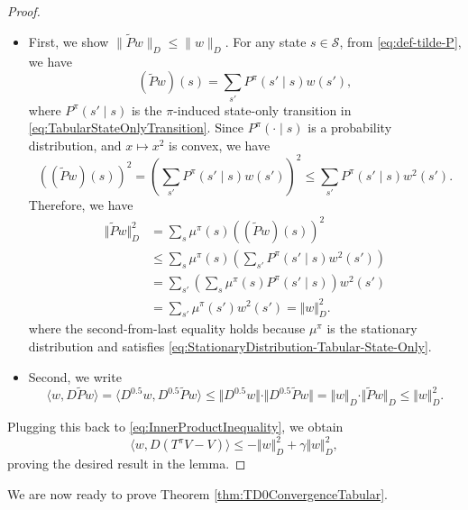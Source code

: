 \documentclass[
]{book}
\theoremstyle{definition}
\theoremstyle{definition}
\theoremstyle{definition}
\theoremstyle{definition}
\theoremstyle{remark}
\begin{document}
\begin{proof}
\begin{itemize}
\item
  First, we show \(\|\widetilde P w\|_D\le \|w\|_D\). For any state \(s \in \mathcal{S}\), from \eqref{eq:def-tilde-P}, we have
  \[
  (\widetilde P w)(s) = \sum_{s'} P^\pi (s' \mid s) w(s'),
  \]
  where \(P^\pi(s' \mid s)\) is the \(\pi\)-induced state-only transition in \eqref{eq:TabularStateOnlyTransition}. Since \(P^\pi(\cdot \mid s)\) is a probability distribution, and \(x \mapsto x^2\) is convex, we have
  \[
  ((\widetilde P w)(s))^2 = \left( \sum_{s'} P^\pi (s' \mid s) w(s') \right)^2 \leq \sum_{s'} P^\pi (s' \mid s) w^2(s').
  \]
  Therefore, we have
  \begin{equation}
  \begin{split}
  \Vert \widetilde P w \Vert_D^2 & = \sum_s \mu^{\pi}(s) ((\widetilde P w)(s))^2 \\
  & \leq \sum_s \mu^{\pi}(s) \left( \sum_{s'} P^\pi (s' \mid s) w^2(s') \right) \\
  & = \sum_{s'} \left( \sum_{s} \mu^\pi(s) P^\pi(s' \mid s) \right) w^2(s') \\
  & = \sum_{s'} \mu^\pi (s') w^2 (s') = \Vert w \Vert_D^2.
  \end{split}
  \end{equation}
  where the second-from-last equality holds because \(\mu^\pi\) is the stationary distribution and satisfies \eqref{eq:StationaryDistribution-Tabular-State-Only}.
\item
  Second, we write
  \[
  \langle w, D\widetilde P w\rangle = \langle D^{0.5} w, D^{0.5} \widetilde P w \rangle \leq \Vert D^{0.5} w \Vert \cdot \Vert D^{0.5} \widetilde P w \Vert = \Vert w \Vert_D \cdot \Vert \widetilde P w \Vert_D \leq \Vert w \Vert_D^2.
  \]
\end{itemize}

Plugging this back to \eqref{eq:InnerProductInequality}, we obtain
\[
\langle w, D(T^\pi V - V) \rangle \leq - \Vert w \Vert_D^2 + \gamma \Vert w \Vert_D^2,
\]
proving the desired result in the lemma.
\end{proof}

We are now ready to prove Theorem \ref{thm:TD0ConvergenceTabular}.
\end{document}
